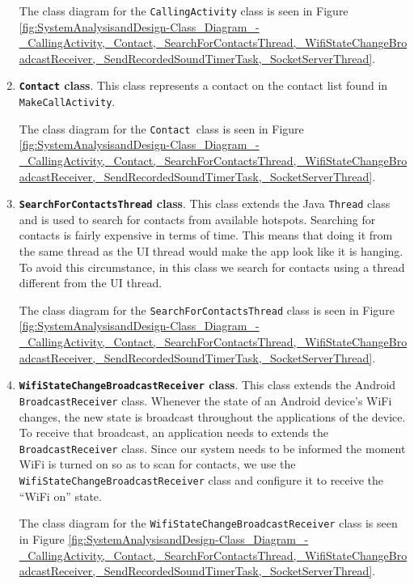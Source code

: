 \documentclass[12pt,svgnames,smaller]{article} %
\begin{document}
\begin{enumerate}
		The class diagram for the \texttt{CallingActivity} class is seen in Figure \ref{fig:SystemAnalysisandDesign-Class_Diagram_-_CallingActivity,_Contact,_SearchForContactsThread,_WifiStateChangeBroadcastReceiver,_SendRecordedSoundTimerTask,_SocketServerThread}.
		
		\item \textbf{\texttt{Contact} class}. This class represents a contact on the contact list found in \texttt{MakeCallActivity}.

		The class diagram for the \texttt{Contact }class is seen in Figure \ref{fig:SystemAnalysisandDesign-Class_Diagram_-_CallingActivity,_Contact,_SearchForContactsThread,_WifiStateChangeBroadcastReceiver,_SendRecordedSoundTimerTask,_SocketServerThread}.
		
		\item \textbf{\texttt{SearchForContactsThread} class}. This class extends the Java \texttt{Thread} class and is used to search for contacts from available hotspots. Searching for contacts is fairly expensive in terms of time. This means that doing it from the same thread as the UI thread would make the app look like it is hanging. To avoid this circumstance, in this class we search for contacts using a thread different from the UI thread.
		
		The class diagram for the \texttt{SearchForContactsThread} class is seen in Figure \ref{fig:SystemAnalysisandDesign-Class_Diagram_-_CallingActivity,_Contact,_SearchForContactsThread,_WifiStateChangeBroadcastReceiver,_SendRecordedSoundTimerTask,_SocketServerThread}.
		
		\item \textbf{\texttt{WifiStateChangeBroadcastReceiver} class}. This class extends the Android \texttt{BroadcastReceiver} class. Whenever the state of an Android device's WiFi changes, the new state is broadcast throughout the applications of the device. To receive that broadcast, an application needs to extends the \texttt{BroadcastReceiver} class. Since our system needs to be informed the moment WiFi is turned on so as to scan for contacts, we use the  \texttt{WifiStateChangeBroadcastReceiver} class and configure it to receive the “WiFi on” state.

		The class diagram for the \texttt{WifiStateChangeBroadcastReceiver} class is seen in Figure \ref{fig:SystemAnalysisandDesign-Class_Diagram_-_CallingActivity,_Contact,_SearchForContactsThread,_WifiStateChangeBroadcastReceiver,_SendRecordedSoundTimerTask,_SocketServerThread}.
		

\end{enumerate}
\end{document}
